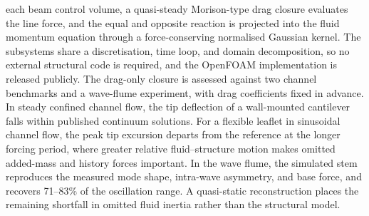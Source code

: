 \documentclass[sn-mathphys,Numbered]{sn-jnl}%
\begin{document}
{each beam control volume, a quasi-steady Morison-type drag closure evaluates the
line force, and the equal and opposite reaction is projected into the fluid
momentum equation through a force-conserving normalised Gaussian kernel. The
subsystems share a discretisation, time loop, and domain decomposition, so no
external structural code is required, and the OpenFOAM implementation is
released publicly. The drag-only closure is assessed against two channel
benchmarks and a wave-flume experiment, with drag coefficients fixed in
advance. In steady confined channel flow, the tip deflection of a wall-mounted
cantilever falls within published continuum solutions. For a flexible leaflet in
sinusoidal channel flow, the peak tip excursion departs from the reference at
the longer forcing period, where greater relative fluid--structure motion makes
omitted added-mass and history forces important. In the wave flume, the
simulated stem reproduces the measured mode shape, intra-wave asymmetry, and
base force, and recovers 71--83\% of the oscillation range. A quasi-static
reconstruction places the remaining shortfall in omitted fluid inertia rather
than the structural model.
}


\maketitle










\end{document}
